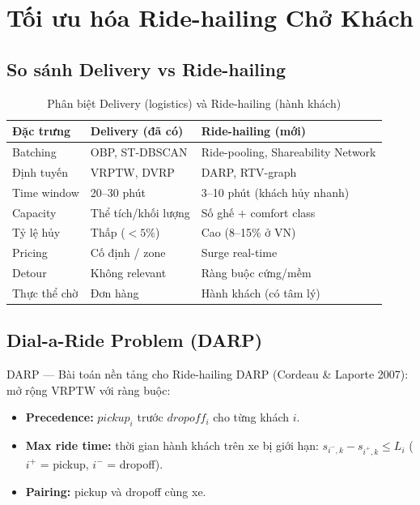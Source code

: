 \documentclass[12pt,a4paper]{article}
\begin{document}
\section{Tối ưu hóa Ride-hailing Chở Khách}

\subsection{So sánh Delivery vs Ride-hailing}

\begin{table}[h!]
\centering
\caption{Phân biệt Delivery (logistics) và Ride-hailing (hành khách)}
\renewcommand{\arraystretch}{1.3}
\begin{tabular}{lp{4.5cm}p{4.5cm}}
\toprule
\textbf{Đặc trưng} & \textbf{Delivery (đã có)} & \textbf{Ride-hailing (mới)} \\
\midrule
Batching & OBP, ST-DBSCAN & Ride-pooling, Shareability Network \\
Định tuyến & VRPTW, DVRP & DARP, RTV-graph \\
Time window & 20--30 phút & 3--10 phút (khách hủy nhanh) \\
Capacity & Thể tích/khối lượng & Số ghế $+$ comfort class \\
Tỷ lệ hủy & Thấp ($< 5\%$) & Cao (8--15\% ở VN) \\
Pricing & Cố định / zone & Surge real-time \\
Detour & Không relevant & Ràng buộc cứng/mềm \\
Thực thể chờ & Đơn hàng & Hành khách (có tâm lý) \\
\bottomrule
\end{tabular}
\end{table}

\subsection{Dial-a-Ride Problem (DARP)}

\begin{definitionbox}{DARP --- Bài toán nền tảng cho Ride-hailing}
DARP (Cordeau \& Laporte 2007): mở rộng VRPTW với ràng buộc:
\begin{itemize}
  \item \textbf{Precedence:} $pickup_i$ trước $dropoff_i$ cho từng khách $i$.
  \item \textbf{Max ride time:} thời gian hành khách trên xe bị giới hạn:
        $s_{i^-,k} - s_{i^+,k} \leq L_i$ ($i^+$ = pickup, $i^-$ = dropoff).
  \item \textbf{Pairing:} pickup và dropoff cùng xe.
\end{itemize}
\end{definitionbox}
\end{document}
